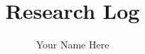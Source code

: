 \documentclass[11pt,letterpaper]{article}
\begin{document}
\title{\Huge Research Log}
\author{Your Name Here}
\maketitle
 
\tableofcontents

\pagebreak




%


\clearpage
\begin{appendices}
%
\clearpage
%
\end{appendices}
\end{document}
